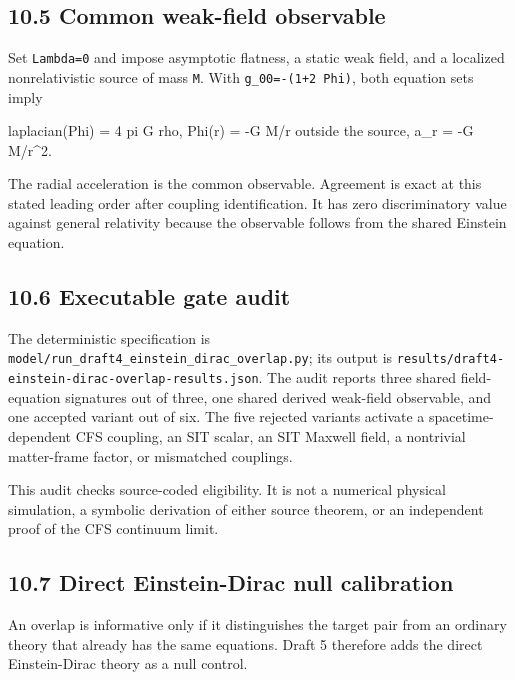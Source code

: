 \documentclass[
  american,
  11pt,
  letterpaper,
]{article}
\newenvironment{Shaded}{}{}
\newcommand{\NormalTok}[1]{#1}
\begin{document}
\subsection{10.5 Common weak-field observable}\label{common-weak-field-observable}

Set \texttt{Lambda=0} and impose asymptotic flatness, a static weak field, and a localized nonrelativistic source of mass \texttt{M}. With \texttt{g\_00=-(1+2\ Phi)}, both equation sets imply

\begin{Shaded}
\begin{Highlighting}[]
\NormalTok{laplacian(Phi) = 4 pi G rho,}
\NormalTok{Phi(r) = {-}G M/r              outside the source,}
\NormalTok{a\_r = {-}G M/r\^{}2.}
\end{Highlighting}
\end{Shaded}

The radial acceleration is the common observable. Agreement is exact at this stated leading order after coupling identification. It has zero discriminatory value against general relativity because the observable follows from the shared Einstein equation.

\subsection{10.6 Executable gate audit}\label{executable-gate-audit}

The deterministic specification is \nolinkurl{model/run_draft4_einstein_dirac_overlap.py}; its output is \nolinkurl{results/draft4-einstein-dirac-overlap-results.json}. The audit reports three shared field-equation signatures out of three, one shared derived weak-field observable, and one accepted variant out of six. The five rejected variants activate a spacetime-dependent CFS coupling, an SIT scalar, an SIT Maxwell field, a nontrivial matter-frame factor, or mismatched couplings.

This audit checks source-coded eligibility. It is not a numerical physical simulation, a symbolic derivation of either source theorem, or an independent proof of the CFS continuum limit.

\subsection{10.7 Direct Einstein-Dirac null calibration}\label{direct-einstein-dirac-null-calibration}

An overlap is informative only if it distinguishes the target pair from an ordinary theory that already has the same equations. Draft 5 therefore adds the direct Einstein-Dirac theory as a null control.
\end{document}
